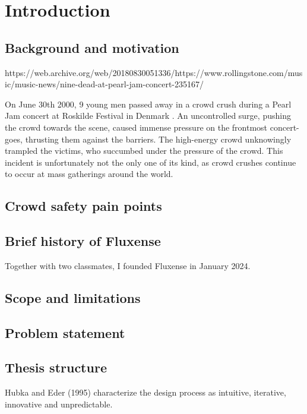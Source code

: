\chapter{Introduction}

\section{Background and motivation}
https://web.archive.org/web/20180830051336/https://www.rollingstone.com/music/music-news/nine-dead-at-pearl-jam-concert-235167/

On June 30th 2000, 9 young men passed away in a crowd crush during a Pearl Jam concert at Roskilde Festival in Denmark \cite{pearl_jam}. An uncontrolled surge, pushing the crowd towards the scene, caused immense pressure on the frontmost concert-goes, thrusting them against the barriers. The high-energy crowd unknowingly trampled the victims, who succumbed under the pressure of the crowd. This incident is unfortunately not the only one of its kind, as crowd crushes continue to occur at mass gatherings around the world.

\section{Crowd safety pain points}

\section{Brief history of Fluxense}

Together with two classmates, I founded Fluxense in January 2024.

\section{Scope and limitations}

\section{Problem statement}
\label{sec:problem-statement}

\section{Thesis structure}

Hubka and Eder (1995) characterize the design process as intuitive, iterative, innovative and unpredictable.

